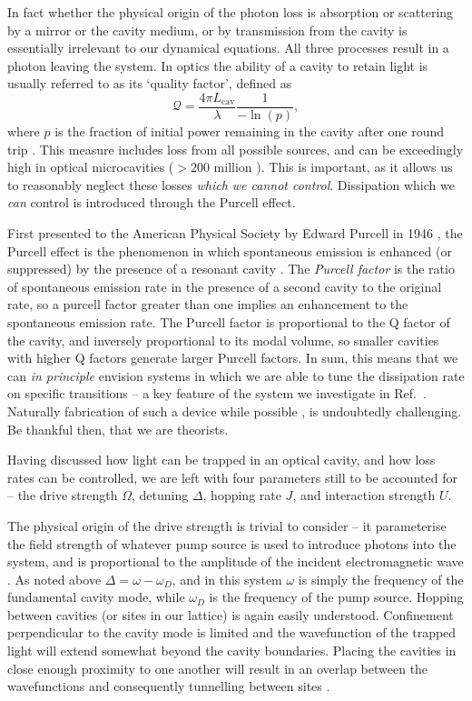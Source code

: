 In fact whether the physical origin of the photon loss is absorption or scattering by a mirror or the cavity medium, or by transmission from the cavity is essentially irrelevant to our dynamical equations. All three processes result in a photon leaving the system. In optics the ability of a cavity to retain light is usually referred to as its `quality factor', defined as
\begin{equation}
	\mathcal{Q} = \frac{4\pi L_{\mathrm{cav}}}{\lambda} \frac{1}{-\ln(p)},
	\label{eq:mbq2-5}
\end{equation}
where \(p\) is the fraction of initial power remaining in the cavity after one round trip \cite{Siegman_chp11}. This measure includes loss from all possible sources, and can be exceedingly high in optical microcavities (\(>200\) million \cite{Yang2017}). This is important, as it allows us to reasonably neglect these losses \emph{which we cannot control}. Dissipation which we \emph{can} control is introduced through the Purcell effect.

First presented to the American Physical Society by Edward Purcell in 1946 \cite{Purcell1946}, the Purcell effect is the phenomenon in which spontaneous emission is enhanced (or suppressed) by the presence of a resonant cavity \cite{Fox_Purcell}. The \emph{Purcell factor} is the ratio of spontaneous emission rate in the presence of a second cavity to the original rate, so a purcell factor greater than one implies an enhancement to the spontaneous emission rate. The Purcell factor is proportional to the Q factor of the cavity, and inversely proportional to its modal volume, so smaller cavities with higher Q factors generate larger Purcell factors. In sum, this means that we can \emph{in principle} envision systems in which we are able to tune the dissipation rate on specific transitions -- a key feature of the system we investigate in Ref.~\cite{Brown2018}. Naturally fabrication of such a device while possible \cite{Gerard1998}, is undoubtedly challenging. Be thankful then, that we are theorists.   

Having discussed how light can be trapped in an optical cavity, and how loss rates can be controlled, we are left with four parameters still to be accounted for -- the drive strength \(\Omega\), detuning \(\Delta\), hopping rate \(J\), and interaction strength \(U\).

The physical origin of the drive strength is trivial to consider -- it parameterise the field strength of whatever pump source is used to introduce photons into the system, and is proportional to the amplitude of the incident electromagnetic wave \cite{Fox_Omega}. As noted above \(\Delta = \omega - \omega_{D}\), and in this system \(\omega\) is simply the frequency of the fundamental cavity mode, while \(\omega_{D}\) is the frequency of the pump source. Hopping between cavities (or sites in our lattice) is again easily understood. Confinement perpendicular to the cavity mode is limited and the wavefunction of the trapped light will extend somewhat beyond the cavity boundaries. Placing the cavities in close enough proximity to one another will result in an overlap between the wavefunctions and consequently tunnelling between sites \cite{Hartmann2006,Hartmann2008}. 

